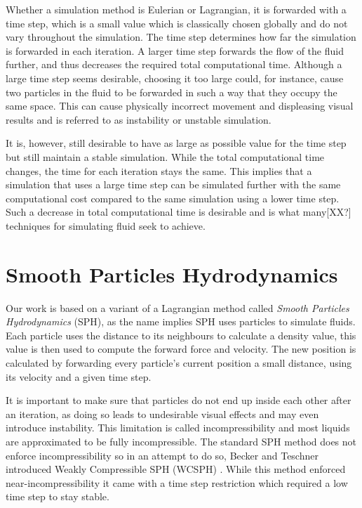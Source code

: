 \documentclass[../../main.tex]{subfiles}
\begin{document}
Whether a simulation method is Eulerian or Lagrangian, it is forwarded with a time step, which is a small value which is classically chosen globally and do not vary throughout the simulation. The time step determines how far the simulation is forwarded in each iteration. A larger time step forwards the flow of the fluid further, and thus decreases the required total computational time. Although a large time step seems desirable, choosing it too large could, for instance, cause two particles in the fluid to be forwarded in such a way that they occupy the same space. This can cause physically incorrect movement and displeasing visual results and is referred to as instability or unstable simulation.

It is, however, still desirable to have as large as possible value for the time step but still maintain a stable simulation. While the total computational time changes, the time for each iteration stays the same. This implies that a simulation that uses a large time step can be simulated further with the same computational cost compared to the same simulation using a lower time step. Such a decrease in total computational time is desirable and is what many[XX?] techniques for simulating fluid seek to achieve.


\section{Smooth Particles Hydrodynamics}
Our work is based on a variant of a Lagrangian method called \textit{Smooth Particles Hydrodynamics} (SPH), as the name implies SPH uses particles to simulate fluids. Each particle uses the distance to its neighbours to calculate a density value, this value is then used to compute the forward force and velocity. The new position is calculated by forwarding every particle's current position a small distance, using its velocity and a given time step. 

It is important to make sure that particles do not end up inside each other after an iteration, as doing so leads to undesirable visual effects and may even introduce instability. This limitation is called incompressibility and most liquids are approximated to be fully incompressible. The standard SPH method does not enforce incompressibility so in an attempt to do so, Becker and Teschner introduced Weakly Compressible SPH (WCSPH) \citep{becker2007weakly}. While this method enforced near-incompressibility it came with a time step restriction which required a low time step to stay stable.
\end{document}
